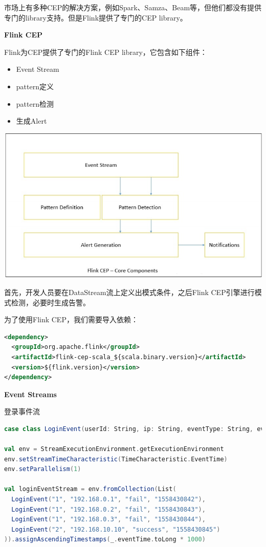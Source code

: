 \documentclass[oneside]{ctexbook}
\begin{document}
市场上有多种CEP的解决方案，例如Spark、Samza、Beam等，但他们都没有提供专门的library支持。但是Flink提供了专门的CEP library。

\textbf{Flink CEP}

Flink为CEP提供了专门的Flink CEP library，它包含如下组件：

\begin{itemize}
\item Event Stream
\item pattern定义
\item pattern检测
\item 生成Alert
\end{itemize}

\noindent \includegraphics[width=\textwidth]{cep6.png}

首先，开发人员要在DataStream流上定义出模式条件，之后Flink CEP引擎进行模式检测，必要时生成告警。

为了使用Flink CEP，我们需要导入依赖：

\begin{lstlisting}[language=xml]
<dependency>
  <groupId>org.apache.flink</groupId>
  <artifactId>flink-cep-scala_${scala.binary.version}</artifactId>
  <version>${flink.version}</version>
</dependency>
\end{lstlisting}

\textbf{Event Streams}

登录事件流

\begin{lstlisting}[language=scala]
case class LoginEvent(userId: String, ip: String, eventType: String, eventTime: String)

val env = StreamExecutionEnvironment.getExecutionEnvironment
env.setStreamTimeCharacteristic(TimeCharacteristic.EventTime)
env.setParallelism(1)

val loginEventStream = env.fromCollection(List(
  LoginEvent("1", "192.168.0.1", "fail", "1558430842"),
  LoginEvent("1", "192.168.0.2", "fail", "1558430843"),
  LoginEvent("1", "192.168.0.3", "fail", "1558430844"),
  LoginEvent("2", "192.168.10.10", "success", "1558430845")
)).assignAscendingTimestamps(_.eventTime.toLong * 1000)
\end{lstlisting}
\end{document}
